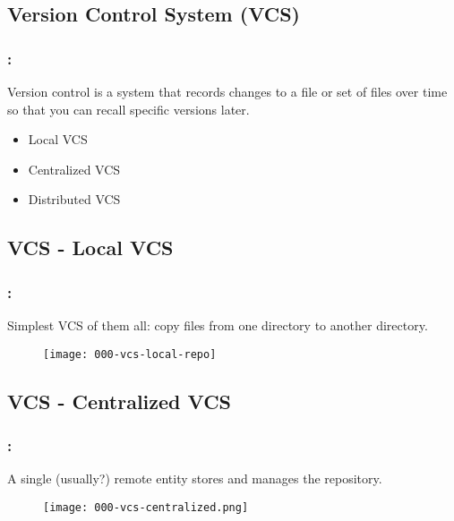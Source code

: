 \subsection{Version Control System (VCS)}
\begin{frame}
    \frametitle{\secname: \small\subsecname\normalsize}

    Version control is a system that records changes to a file or set of files over time so that you can recall specific versions later.

    \begin{itemize}
        \item Local VCS
        \item Centralized VCS
        \item Distributed VCS
    \end{itemize}
\end{frame}

\subsection{VCS - Local VCS}
\begin{frame}
    \frametitle{\secname: \small\subsecname\normalsize}

    Simplest VCS of them all: copy files from one directory to another directory.

    \begin{figure}[h]
        \texttt{[image: 000-vcs-local-repo]}
        \centering
    \end{figure}
\end{frame}

\subsection{VCS - Centralized VCS}
\begin{frame}
    \frametitle{\secname: \small\subsecname\normalsize}

    A single (usually?) remote entity stores and manages the repository.

    \begin{figure}[h]
        \texttt{[image: 000-vcs-centralized.png]}
        \centering
    \end{figure}
\end{frame}

